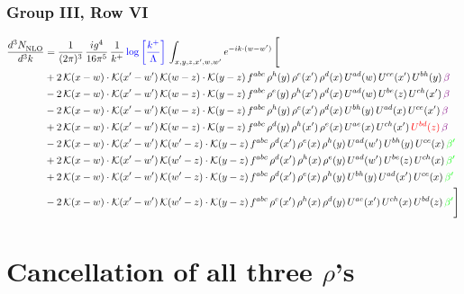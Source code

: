 \documentclass[9pt]{article}
\numberwithin{equation}{section}
\begin{document}
\subsubsection{Group III, Row VI}
\begin{align}
     \frac{d^{3}N_{\rm NLO}^{\rm}}{d^{3}k}  & = \frac{1}{(2\pi)^{3}}\, \frac{ig^{4}}{16\pi^{5}}\, \frac{1}{k^{+}}\, {\color{blue}\log{\left[\frac{k^{+}}{\Lambda}\right]}}\,\int_{x,y,z,x^{\prime},w,w^{\prime}}e^{-ik\cdot (w-w')}\, \Bigg[\notag \\ & +2\,\mathcal{K}(x-w)\cdot\mathcal{K}(x'-w')\,\mathcal{K}(w-z)\cdot\mathcal{K}(y-z)\, f^{abc}\,\rho^{h}(y)\,\rho^{e}(x')\,\rho^{d}(x)\,U^{ad}(w)\,U^{ce}(x')\,U^{bh}(y)\,{\color{violet} \beta}\notag\\ &-2\,\mathcal{K}(x-w)\cdot\mathcal{K}(x'-w')\,\mathcal{K}(w-z)\cdot\mathcal{K}(y-z)\, f^{abc}\,\rho^{e}(y)\,\rho^{h}(x')\,\rho^{d}(x)\,U^{ad}(w)\,U^{be}(z)\,U^{ch}(x')\,{\color{violet} \beta}\notag \\ &-2\,\mathcal{K}(x-w)\cdot\mathcal{K}(x'-w')\,\mathcal{K}(w-z)\cdot\mathcal{K}(y-z)\, f^{abc}\,\rho^{h}(y)\,\rho^{e}(x')\,\rho^{d}(x)\,U^{bh}(y)\,U^{ad}(x)\,U^{ce}(x')\,{\color{violet} \beta}\notag\\ & +2\,\mathcal{K}(x-w)\cdot\mathcal{K}(x'-w')\,\mathcal{K}(w-z)\cdot\mathcal{K}(y-z)\, f^{abc}\,\rho^{d}(y)\,\rho^{h}(x')\,\rho^{e}(x)\,U^{ae}(x)\,U^{ch}(x')\,{\color{red}U^{bd}(z)}\,{\color{violet} \beta}\notag\\ & -2\, \mathcal{K}(x-w) \cdot \mathcal{K}(x'-w')\, \mathcal{K}(w'-z) \cdot \mathcal{K}(y-z)\, f^{abc}\, \rho^{d}(x')\,\rho^{e}(x)\, \rho^{h}(y)\,U^{ad}(w')\,U^{bh}(y)\,U^{ce}(x)\, {\color{green} \beta'}\notag \\ & + 2\, \mathcal{K}(x-w) \cdot \mathcal{K}(x'-w')\, \mathcal{K}(w'-z) \cdot \mathcal{K}(y-z)\, f^{abc}\, \rho^{d}(x')\,\rho^{h}(x)\, \rho^{e}(y)\,U^{ad}(w')\,U^{be}(z)\,U^{ch}(x)\, {\color{green} \beta'}\notag \\ & +2\, \mathcal{K}(x-w) \cdot \mathcal{K}(x'-w')\, \mathcal{K}(w'-z) \cdot \mathcal{K}(y-z)\, f^{abc}\, \rho^{d}(x')\,\rho^{e}(x)\, \rho^{h}(y)\,U^{bh}(y)\,U^{ad}(x')\,U^{ce}(x)\, {\color{green} \beta'}\notag \\ & -2\, \mathcal{K}(x-w) \cdot \mathcal{K}(x'-w')\, \mathcal{K}(w'-z) \cdot \mathcal{K}(y-z)\, f^{abc}\, \rho^{e}(x')\,\rho^{h}(x)\, \rho^{d}(y)\,U^{ae}(x')\,U^{ch}(x)\,U^{bd}(z)\, {\color{green} \beta'}\Bigg]
\end{align}  
\section{Cancellation of all three $\rho$'s} 
\end{document}
